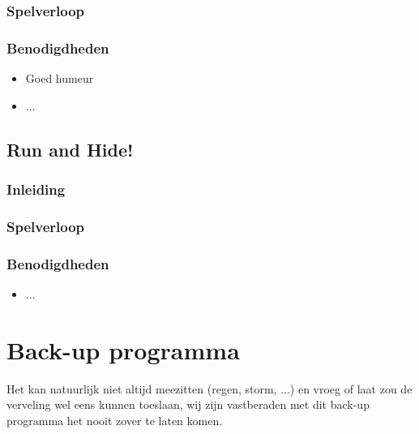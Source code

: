 \documentclass[fleqn,10pt]{src/KampSjabloon}
\begin{document}
\subsubsection*{Spelverloop}
\subsubsection*{Benodigdheden}

\begin{itemize}
\item Goed humeur
\item ...
\end{itemize}

\subsection*{Run and Hide!}
\label{runandhide} %

\subsubsection*{Inleiding}
\subsubsection*{Spelverloop}
\subsubsection*{Benodigdheden}

\begin{itemize}
\item ...
\end{itemize}


\section{Back-up programma}
\label{backup}
Het kan natuurlijk niet altijd meezitten (regen, storm, ...) en vroeg of laat zou de verveling wel eens kunnen toeslaan, wij zijn vastberaden met dit back-up programma het nooit zover te laten komen.
\end{document}
